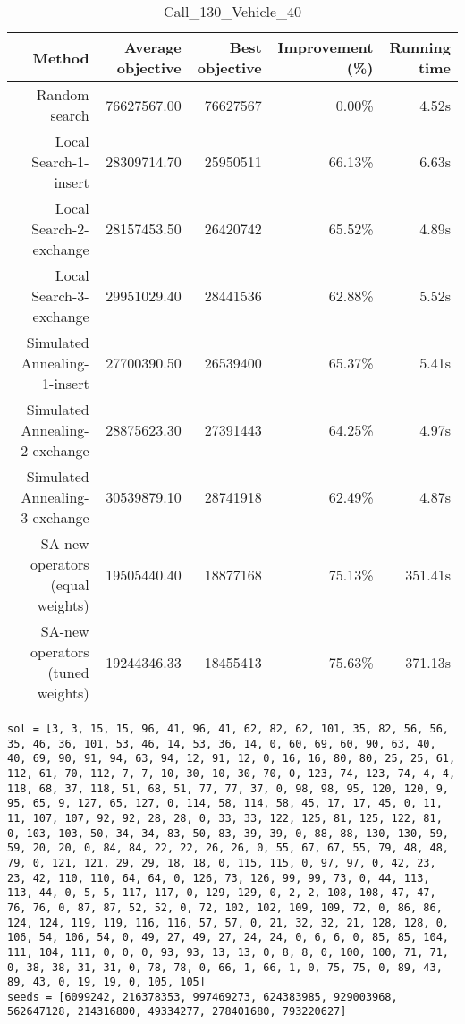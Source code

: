 \begin{table}[ht]
\centering
\caption{Call\_130\_Vehicle\_40}
\label{tab:call130vehicle40}
\begin{tabular}{|r|r|r|r|r|}
Method & Average objective & Best objective & Improvement (\%) & Running time \\
\hline
Random search & 76627567.00 & 76627567 & 0.00\% & 4.52s\\
Local Search-1-insert & 28309714.70 & 25950511 & 66.13\% & 6.63s\\
Local Search-2-exchange & 28157453.50 & 26420742 & 65.52\% & 4.89s\\
Local Search-3-exchange & 29951029.40 & 28441536 & 62.88\% & 5.52s\\
Simulated Annealing-1-insert & 27700390.50 & 26539400 & 65.37\% & 5.41s\\
Simulated Annealing-2-exchange & 28875623.30 & 27391443 & 64.25\% & 4.97s\\
Simulated Annealing-3-exchange & 30539879.10 & 28741918 & 62.49\% & 4.87s\\
SA-new operators (equal weights) & 19505440.40 & 18877168 & 75.13\% & 351.41s\\
SA-new operators (tuned weights) & 19244346.33 & 18455413 & 75.63\% & 371.13s\\
\end{tabular}%
\end{table}
\begin{lstlisting}[label={lst:call130vehicle40},caption=Optimal solution call\_130\_vehicle\_40]
sol = [3, 3, 15, 15, 96, 41, 96, 41, 62, 82, 62, 101, 35, 82, 56, 56, 35, 46, 36, 101, 53, 46, 14, 53, 36, 14, 0, 60, 69, 60, 90, 63, 40, 40, 69, 90, 91, 94, 63, 94, 12, 91, 12, 0, 16, 16, 80, 80, 25, 25, 61, 112, 61, 70, 112, 7, 7, 10, 30, 10, 30, 70, 0, 123, 74, 123, 74, 4, 4, 118, 68, 37, 118, 51, 68, 51, 77, 77, 37, 0, 98, 98, 95, 120, 120, 9, 95, 65, 9, 127, 65, 127, 0, 114, 58, 114, 58, 45, 17, 17, 45, 0, 11, 11, 107, 107, 92, 92, 28, 28, 0, 33, 33, 122, 125, 81, 125, 122, 81, 0, 103, 103, 50, 34, 34, 83, 50, 83, 39, 39, 0, 88, 88, 130, 130, 59, 59, 20, 20, 0, 84, 84, 22, 22, 26, 26, 0, 55, 67, 67, 55, 79, 48, 48, 79, 0, 121, 121, 29, 29, 18, 18, 0, 115, 115, 0, 97, 97, 0, 42, 23, 23, 42, 110, 110, 64, 64, 0, 126, 73, 126, 99, 99, 73, 0, 44, 113, 113, 44, 0, 5, 5, 117, 117, 0, 129, 129, 0, 2, 2, 108, 108, 47, 47, 76, 76, 0, 87, 87, 52, 52, 0, 72, 102, 102, 109, 109, 72, 0, 86, 86, 124, 124, 119, 119, 116, 116, 57, 57, 0, 21, 32, 32, 21, 128, 128, 0, 106, 54, 106, 54, 0, 49, 27, 49, 27, 24, 24, 0, 6, 6, 0, 85, 85, 104, 111, 104, 111, 0, 0, 0, 93, 93, 13, 13, 0, 8, 8, 0, 100, 100, 71, 71, 0, 38, 38, 31, 31, 0, 78, 78, 0, 66, 1, 66, 1, 0, 75, 75, 0, 89, 43, 89, 43, 0, 19, 19, 0, 105, 105]
seeds = [6099242, 216378353, 997469273, 624383985, 929003968, 562647128, 214316800, 49334277, 278401680, 793220627]
\end{lstlisting}%
\clearpage


